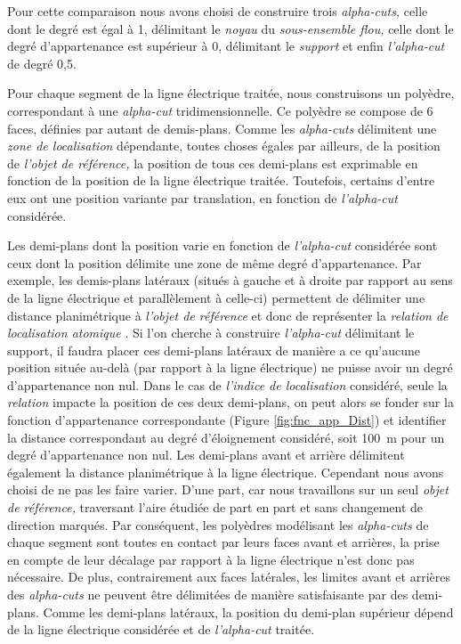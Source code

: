 Pour cette comparaison nous avons choisi de construire trois \emph{alpha-cuts,} celle dont le degré est égal à 1, délimitant le \emph{noyau} du \emph{sous-ensemble flou,} celle dont le degré d'appartenance est supérieur à 0, délimitant le \emph{support} et enfin \emph{l'alpha-cut} de degré 0,5.

Pour chaque segment de la ligne électrique traitée, nous construisons un polyèdre, correspondant à une \emph{alpha-cut} tridimensionnelle. Ce polyèdre se compose de 6 faces, définies par autant de demis-plans. Comme les \emph{alpha-cuts} délimitent une \emph{zone de localisation} dépendante, toutes choses égales par ailleurs, de la position de \emph{l'objet de référence,} la position de tous ces demi-plans est exprimable en fonction de la position de la ligne électrique traitée. Toutefois, certains d'entre eux ont une position variante par translation, en fonction de \emph{l'alpha-cut} considérée.

Les demi-plans dont la position varie en fonction de \emph{l'alpha-cut} considérée sont ceux dont la position délimite une zone de même degré d'appartenance. Par exemple, les demis-plans latéraux (\ie situés à gauche et à droite par rapport au sens de la ligne électrique et parallèlement à celle-ci) permettent de délimiter une distance planimétrique à \emph{l'objet de référence} et donc de représenter la \emph{relation de localisation atomique} . Si l'on cherche à construire \emph{l'alpha-cut} délimitant le support, il faudra placer ces demi-plans latéraux de manière a ce qu'aucune position située au-delà (par rapport à la ligne électrique) ne puisse avoir un degré d'appartenance non nul. Dans le cas de \emph{l'indice de localisation} considéré, seule la \emph{relation}  impacte la position de ces deux demi-plans, on peut alors se fonder sur la fonction d'appartenance correspondante (Figure \ref{fig:fnc_app_Dist}) et identifier la distance correspondant au degré d'éloignement considéré, soit \SI{100}{\meter} pour un degré d'appartenance non nul. Les demi-plans avant et arrière délimitent également la distance planimétrique à la ligne électrique. Cependant nous avons choisi de ne pas les faire varier. D'une part, car nous travaillons sur un seul \emph{objet de référence,} traversant l'aire étudiée de part en part et sans changement de direction marqués. Par conséquent, les polyèdres modélisant les \emph{alpha-cuts} de chaque segment sont toutes en contact par leurs faces avant et arrières, la prise en compte de leur décalage par rapport à la ligne électrique n'est donc pas nécessaire. De plus, contrairement aux faces latérales, les limites avant et arrières des \emph{alpha-cuts} ne peuvent être délimitées de manière satisfaisante par des demi-plans.
% 
Comme les demi-plans latéraux, la position du demi-plan supérieur dépend de la ligne électrique considérée et de \emph{l'alpha-cut} traitée.

